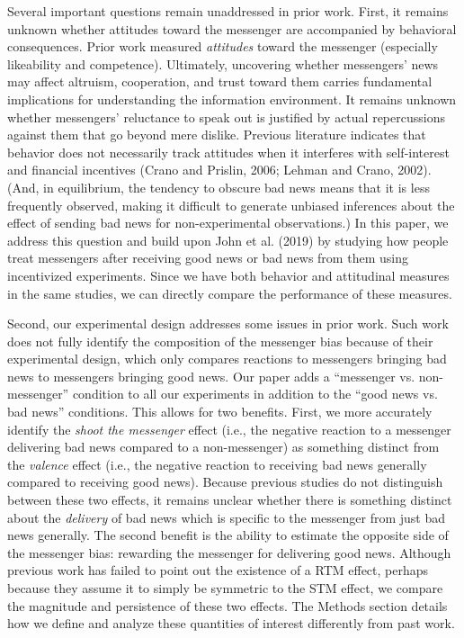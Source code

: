 Several important questions remain unaddressed in prior work. First, it
remains unknown whether attitudes toward the messenger are accompanied
by behavioral consequences. Prior work measured
\emph{attitudes} toward the messenger (especially
likeability and competence). Ultimately, uncovering whether messengers'
news may affect altruism, cooperation, and trust toward them carries
fundamental implications for understanding the information environment.
It remains unknown whether messengers' reluctance to speak out is
justified by actual repercussions against them that go beyond mere
dislike. Previous literature indicates that behavior does not
necessarily track attitudes when it interferes with self-interest and
financial incentives (Crano and Prislin, 2006; Lehman and Crano, 2002).
(And, in equilibrium, the tendency to obscure bad news means that it is
less frequently observed, making it difficult to generate unbiased
inferences about the effect of sending bad news for non-experimental
observations.) In this paper, we address this question and build upon
John et al. (2019) by studying how people treat messengers after
receiving good news or bad news from them using incentivized
experiments. Since we have both behavior and attitudinal measures in the
same studies, we can directly compare the performance of these measures.

Second, our experimental design addresses some issues in prior work.
Such work does not fully identify the composition of the messenger bias
because of their experimental design, which only compares reactions to
messengers bringing bad news to messengers bringing good news. Our paper
adds a ``messenger vs. non-messenger'' condition to all our
experiments in addition to the ``good news vs. bad news'' conditions.
This allows for two benefits. First, we more accurately identify the
\emph{shoot the messenger} effect (i.e., the negative reaction to a
messenger delivering bad news compared to a non-messenger) as something
distinct from the \emph{valence} effect (i.e., the negative reaction to
receiving bad news generally compared to receiving good news). Because
previous studies do not distinguish between these two effects, it
remains unclear whether there is something distinct about the
\emph{delivery} of bad news which is specific to the messenger from just
bad news generally. The second benefit is the ability to estimate the
opposite side of the messenger bias: rewarding the messenger for
delivering good news. Although previous work has failed to point out the
existence of a RTM effect, perhaps because they assume it to simply be
symmetric to the STM effect, we compare the magnitude and persistence of
these two effects. The Methods section details how we define and analyze
these quantities of interest differently from past work.

